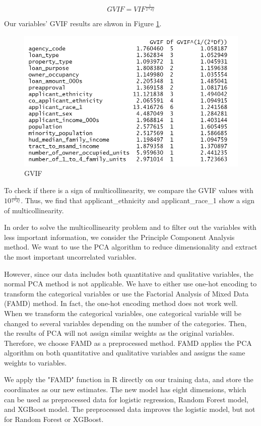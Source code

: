 \documentclass{jpp}
\begin{document}
$$GVIF = VIF^{\frac{1}{2*df}}$$

Our variables’ GVIF results are shwon in Figure \ref{gvif}.

\begin{figure}
  \centering
  \includegraphics[width=.9\linewidth]{gvif.png}
  \caption{GVIF}\label{gvif}
\end{figure}

To check if there is a sign of multicollinearity, we compare the GVIF values with $10^{\frac{1}{2*df}}$. Thus, we find that applicant\_ethnicity and applicant\_race\_1 show a sign of multicollinearity.

In order to solve the multicollinearity problem and to filter out the variables with less important information, we consider the Principle Component Analysis method. We want to use the PCA algorithm to reduce dimensionality and extract the most important uncorrelated variables.

However, since our data includes both quantitative and qualitative variables, the normal PCA method is not applicable. We have to either use one-hot encoding to transform the categorical variables or use the Factorial Analysis of Mixed Data (FAMD) method. In fact, the one-hot encoding method does not work well. When we transform the categorical variables, one categorical variable will be changed to several variables depending on the number of the categories. Then, the results of PCA will not assign similar weights as the original variables. Therefore, we choose FAMD as a preprocessed method. FAMD applies the PCA algorithm on both quantitative and qualitative variables and assigns the same weights to variables.
 
We apply the "FAMD" function in R directly on our training data, and store the coordinates as our new estimates. The new model has eight dimensions, which can be used as preprocessed data for logistic regression, Random Forest model, and XGBoost model. The preprocessed data improves the logistic model, but not for Random Forest or XGBoost.
\end{document}
